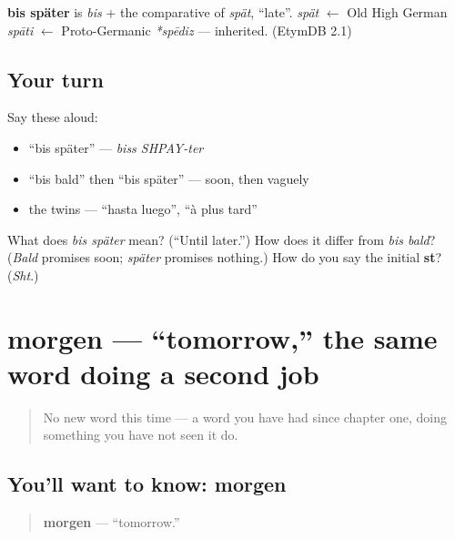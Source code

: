 \begin{cousinweb}
\textbf{bis später} is \emph{bis} + the comparative of \emph{spät}, \textquotedblleft{}late\textquotedblright{}. \emph{spät} $\leftarrow$ Old High German \emph{spāti} $\leftarrow$ Proto-Germanic \emph{*spēdiz} — inherited. (EtymDB 2.1)
\end{cousinweb}

\subsection*{Your turn}
Say these aloud:

\begin{itemize}
\raggedright
  \item \textquotedblleft{}bis später\textquotedblright{} — \emph{biss SHPAY-ter}
  \item \textquotedblleft{}bis bald\textquotedblright{} then \textquotedblleft{}bis später\textquotedblright{} — soon, then vaguely
  \item the twins — \textquotedblleft{}hasta luego\textquotedblright{}, \textquotedblleft{}à plus tard\textquotedblright{}
\end{itemize}

\begin{tcolorbox}[breakable,colback=teal!4,colframe=teal!35!black,title={Before you move on}]
What does \emph{bis später} mean? (\textquotedblleft{}Until later.\textquotedblright{}) How does it differ from \emph{bis bald}? (\emph{Bald} promises soon; \emph{später} promises nothing.) How do you say the initial \textbf{st}? (\emph{Sht}.)
\end{tcolorbox}
\section[morgen]{morgen — \textquotedblleft{}tomorrow,\textquotedblright{} the same word doing a second job}

\label{lesson:GE-C04-morgen-tomorrow}



\begin{quote}
No new word this time — a word you have had since chapter one, doing something you have not seen it do.
\end{quote}

\subsection*{You'll want to know: morgen}
\begin{quote}
\textbf{morgen} — \textquotedblleft{}tomorrow.\textquotedblright{}
\end{quote}

